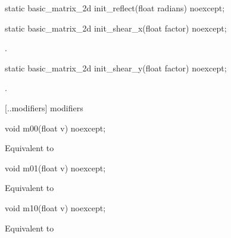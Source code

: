 %
\begin{itemdecl}
static basic_matrix_2d init_reflect(float radians) noexcept;
\end{itemdecl}
\begin{itemdescr}
\pnum
\returns
{}
\end{itemdescr}

%
\begin{itemdecl}
static basic_matrix_2d init_shear_x(float factor) noexcept;
\end{itemdecl}
\begin{itemdescr}
\pnum
\returns
{}.
\end{itemdescr}

%
\begin{itemdecl}
static basic_matrix_2d init_shear_y(float factor) noexcept;
\end{itemdecl}
\begin{itemdescr}
\pnum
\returns
{}.
\end{itemdescr}

 [\iotwod.\matrixtwod.modifiers] { modifiers}

%
\begin{itemdecl}
void m00(float v) noexcept;
\end{itemdecl}
\begin{itemdescr}
\pnum
\effects
Equivalent to 
\end{itemdescr}

%
\begin{itemdecl}
void m01(float v) noexcept;
\end{itemdecl}
\begin{itemdescr}
\pnum
\effects
Equivalent to 
\end{itemdescr}

%
\begin{itemdecl}
void m10(float v) noexcept;
\end{itemdecl}
\begin{itemdescr}
\pnum
\effects
Equivalent to 
\end{itemdescr}

